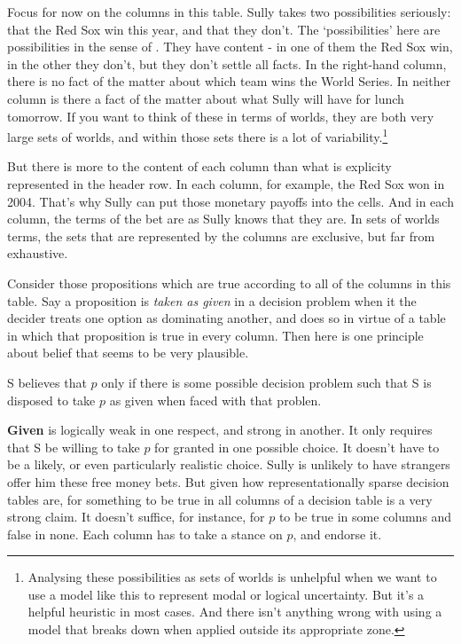 \documentclass[11pt,]{book}
\providecommand{\tightlist}{%
  \setlength{\itemsep}{0pt}\setlength{\parskip}{0pt}}
\let\rmarkdownfootnote\footnote%
\def\footnote{\protect\rmarkdownfootnote}
\begin{document}
Focus for now on the columns in this table. Sully takes two possibilities seriously: that the Red Sox win this year, and that they don't. The `possibilities' here are possibilities in the sense of \citet{Humberstone1981}. They have content - in one of them the Red Sox win, in the other they don't, but they don't settle all facts. In the right-hand column, there is no fact of the matter about which team wins the World Series. In neither column is there a fact of the matter about what Sully will have for lunch tomorrow. If you want to think of these in terms of worlds, they are both very large sets of worlds, and within those sets there is a lot of variability.\footnote{Analysing these possibilities as sets of worlds is unhelpful when we want to use a model like this to represent modal or logical uncertainty. But it's a helpful heuristic in most cases. And there isn't anything wrong with using a model that breaks down when applied outside its appropriate zone.}

But there is more to the content of each column than what is explicity represented in the header row. In each column, for example, the Red Sox won in 2004. That's why Sully can put those monetary payoffs into the cells. And in each column, the terms of the bet are as Sully knows that they are. In sets of worlds terms, the sets that are represented by the columns are exclusive, but far from exhaustive.

Consider those propositions which are true according to all of the columns in this table. Say a proposition is \emph{taken as given} in a decision problem when it the decider treats one option as dominating another, and does so in virtue of a table in which that proposition is true in every column. Then here is one principle about belief that seems to be very plausible.

\begin{description}
\tightlist
\item[Given]
S believes that \(p\) only if there is some possible decision problem such that S is disposed to take \(p\) as given when faced with that problen.
\end{description}

\textbf{Given} is logically weak in one respect, and strong in another. It only requires that S be willing to take \(p\) for granted in one possible choice. It doesn't have to be a likely, or even particularly realistic choice. Sully is unlikely to have strangers offer him these free money bets. But given how representationally sparse decision tables are, for something to be true in all columns of a decision table is a very strong claim. It doesn't suffice, for instance, for \(p\) to be true in some columns and false in none. Each column has to take a stance on \(p\), and endorse it.
\end{document}
